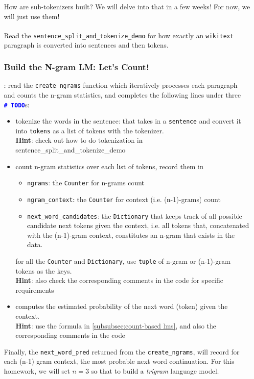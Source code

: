 How are sub-tokenizers built? We will delve into that in a few weeks! For now, we will just use them!
\\\\
\noindent Read the \texttt{sentence\_split\_and\_tokenize\_demo} for how exactly an \texttt{wikitext} paragraph is converted into sentences and then tokens.

\subsubsection{Build the N-gram LM: Let's Count!}
\noindent\todo{}: read the \texttt{create\_ngrams} function which iteratively processes each paragraph and counts the n-gram statistics, and completes the following lines under three \textcolor{blue}{\texttt{\textbf{\#~TODO}}}s:
\begin{itemize}
    \item tokenize the words in the sentence: that takes in a \texttt{sentence} and convert it into \texttt{tokens} as a list of tokens with the tokenizer. \\
    \textbf{Hint}: check out how to do tokenization in sentence\_split\_and\_tokenize\_demo
    \item count n-gram statistics over each list of tokens, record them in
    \begin{itemize}
        \item \texttt{ngrams}: the \texttt{Counter} for n-grams count
        \item \texttt{ngram\_context}: the \texttt{Counter} for context (i.e. (n-1)-grams) 
        count
        \item \texttt{next\_word\_candidates}: the \texttt{Dictionary} that keeps track of all possible candidate next tokens given the context, i.e. all tokens that, concatenated with the (n-1)-gram context, constitutes an n-gram that exists in the data. 
    \end{itemize}
    for all the \texttt{Counter} and \texttt{Dictionary}, use \texttt{tuple} of n-gram or (n-1)-gram tokens as the keys. \\
    \textbf{Hint}: also check the corresponding comments in the code for specific requirements
    \item computes the estimated probability of the next word (token) given the context. \\\textbf{Hint}: use the formula in \autoref{subsubsec:count-based lms}, and also the corresponding comments in the code
\end{itemize}
Finally, the \texttt{next\_word\_pred} returned from the \texttt{create\_ngrams}, will record for each (n-1) gram context, the most probable next word continuation. For this homework, we will set $n=3$ so that to build a \textit{trigram} language model.

